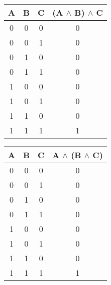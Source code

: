 \documentclass[11pt]{article}
\begin{document}
\begin{enumerate}
\begin{tabular}{| c | c | c | c |}
  \hline
  A & B & C & (A $\land$ B) $\land$ C \\ \hline
  0 & 0 & 0 & 0 \\
  0 & 0 & 1 & 0 \\
  0 & 1 & 0 & 0 \\
  0 & 1 & 1 & 0 \\
  1 & 0 & 0 & 0 \\
  1 & 0 & 1 & 0 \\
  1 & 1 & 0 & 0 \\
  1 & 1 & 1 & 1 \\ \hline
\end{tabular}
\quad
\begin{tabular}{| c | c | c | c |}
  \hline
  A & B & C & A $\land$ (B $\land$ C) \\ \hline
  0 & 0 & 0 & 0 \\
  0 & 0 & 1 & 0 \\
  0 & 1 & 0 & 0 \\
  0 & 1 & 1 & 0 \\
  1 & 0 & 0 & 0 \\
  1 & 0 & 1 & 0 \\
  1 & 1 & 0 & 0 \\
  1 & 1 & 1 & 1 \\ \hline
\end{tabular}
\end{enumerate}
\end{document}
